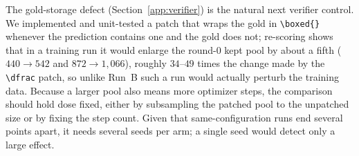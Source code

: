 \documentclass[runningheads]{llncs}
\begin{document}
The gold-storage defect (Section~\ref{app:verifier}) is the natural next
verifier control. We implemented and unit-tested a patch that wraps the gold in
\verb|\boxed{}| whenever the prediction contains one and the gold does not;
re-scoring shows that in a training run it would enlarge the round-0 kept pool
by about a fifth ($440\to542$ and $872\to1{,}066$), roughly $34$--$49$ times the
change made by the \verb|\dfrac| patch, so unlike Run~B such a run would
actually perturb the training data. Because a larger pool also means more
optimizer steps, the comparison should hold dose fixed, either by subsampling
the patched pool to the unpatched size or by fixing the step count. Given that
same-configuration runs end several points apart, it needs several seeds per
arm; a single seed would detect only a large effect.
\end{document}

